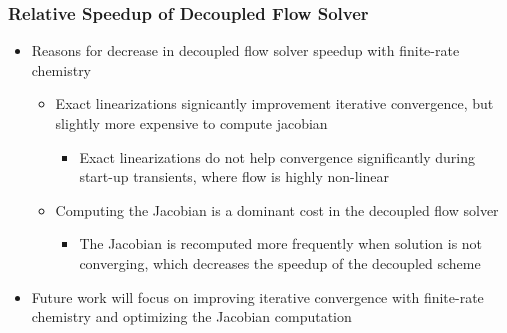 \documentclass{beamer}
\begin{document}
\begin{frame}
  \frametitle{Relative Speedup of Decoupled Flow Solver}
  \begin{itemize}
    \item Reasons for decrease in decoupled flow solver speedup with finite-rate
      chemistry
    \begin{itemize}
      \item Exact linearizations signicantly improvement iterative convergence,
        but slightly more expensive to compute jacobian
        \begin{itemize}
          \item Exact linearizations do not help convergence significantly during
            start-up transients, where flow is highly non-linear
        \end{itemize}
      \item Computing the Jacobian is a dominant cost in the decoupled flow
        solver
        \begin{itemize}
          \item The Jacobian is recomputed more frequently when solution is not
            converging, which decreases the speedup of the decoupled scheme
        \end{itemize}
    \end{itemize}
  \item Future work will focus on improving iterative convergence with
    finite-rate chemistry and optimizing the Jacobian computation 
  \end{itemize}
\end{frame}
\end{document}
